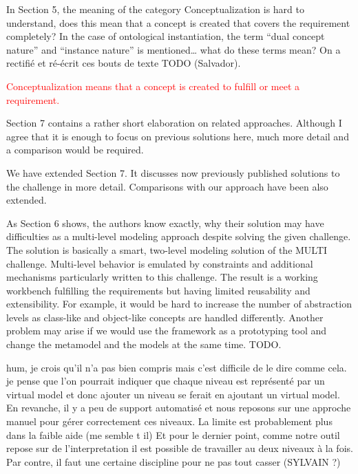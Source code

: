 \documentclass[10pt]{article}
\begin{document}
\begin{response}{In Section 5, the meaning of the category Conceptualization is hard to understand, does this mean that a concept is created that covers the requirement completely? In the case of ontological instantiation, the term “dual concept nature” and “instance nature” is mentioned… what do these terms mean?}
On a rectifié et ré-écrit ces bouts de texte
TODO (Salvador).

\textcolor{red}{Conceptualization means that a concept is created to fulfill or meet a requirement. }

\end{response}

\begin{response}{Section 7 contains a rather short elaboration on related approaches. Although I agree that it is enough to focus on previous solutions here, much more detail and a comparison would be required.}

We have extended Section 7. It discusses now previously published solutions to the challenge in more detail. Comparisons with our approach have been also extended.

\end{response}

\begin{response}{As Section 6 shows, the authors know exactly, why their solution may have difficulties as a multi-level modeling approach despite solving the given challenge. The solution is basically a smart, two-level modeling solution of the MULTI challenge. Multi-level behavior is emulated by constraints and additional mechanisms particularly written to this challenge. The result is a working workbench fulfilling the requirements but having limited reusability and extensibility. For example, it would be hard to increase the number of abstraction levels as class-like and object-like concepts are handled differently. Another problem may arise if we would use the framework as a prototyping tool and change the metamodel and the models at the same time.}
TODO.

{\color{teal}hum, je crois qu'il n'a pas bien compris mais c'est difficile de le dire comme cela. je pense que l'on pourrait indiquer que chaque niveau est représenté par un virtual model et donc ajouter un niveau se ferait en ajoutant un virtual model. En revanche, il y a peu de support automatisé et nous reposons sur une approche manuel pour gérer correctement ces niveaux. La limite est probablement plus dans la faible aide (me semble t il) Et pour le dernier point, comme notre outil repose sur de l'interpretation il est possible de travailler au deux niveaux à la fois. Par contre, il faut une certaine discipline pour ne pas tout casser (SYLVAIN ?)}
\end{response}
\end{document}
